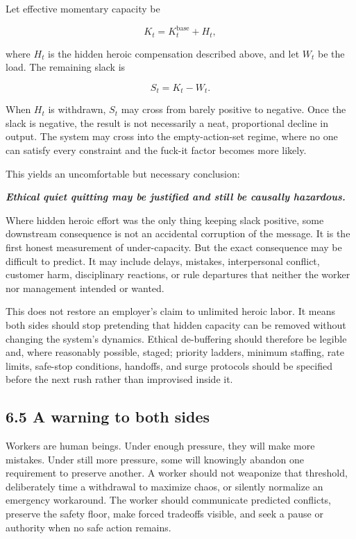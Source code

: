 \documentclass[11pt,oneside]{article}
\renewenvironment{quote}
  {\begin{tcolorbox}[
      enhanced,
      breakable,
      colback=ManifestLight,
      colframe=ManifestRule,
      boxrule=0pt,
      leftrule=3pt,
      arc=0pt,
      outer arc=0pt,
      left=10pt,right=10pt,top=8pt,bottom=8pt,
      before skip=0.8em,after skip=0.8em
    ]\itshape}
  {\end{tcolorbox}}
\begin{document}
Let effective momentary capacity be

\[
K_t = K_t^{\mathrm{base}} + H_t,
\]

where \(H_t\) is the hidden heroic compensation described above, and let
\(W_t\) be the load. The remaining slack is

\[
S_t = K_t - W_t.
\]

When \(H_t\) is withdrawn, \(S_t\) may cross from barely positive to
negative. Once the slack is negative, the result is not necessarily a
neat, proportional decline in output. The system may cross into the
empty-action-set regime, where no one can satisfy every constraint and
the fuck-it factor becomes more likely.

This yields an uncomfortable but necessary conclusion:

\begin{quote}
\textbf{Ethical quiet quitting may be justified and still be causally
hazardous.}
\end{quote}

Where hidden heroic effort was the only thing keeping slack positive,
some downstream consequence is not an accidental corruption of the
message. It is the first honest measurement of under-capacity. But the
exact consequence may be difficult to predict. It may include delays,
mistakes, interpersonal conflict, customer harm, disciplinary reactions,
or rule departures that neither the worker nor management intended or
wanted.

This does not restore an employer's claim to unlimited heroic labor. It
means both sides should stop pretending that hidden capacity can be
removed without changing the system's dynamics. Ethical de-buffering
should therefore be legible and, where reasonably possible, staged;
priority ladders, minimum staffing, rate limits, safe-stop conditions,
handoffs, and surge protocols should be specified before the next rush
rather than improvised inside it.

\subsection{6.5 A warning to both sides}\label{a-warning-to-both-sides}

Workers are human beings. Under enough pressure, they will make more
mistakes. Under still more pressure, some will knowingly abandon one
requirement to preserve another. A worker should not weaponize that
threshold, deliberately time a withdrawal to maximize chaos, or silently
normalize an emergency workaround. The worker should communicate
predicted conflicts, preserve the safety floor, make forced tradeoffs
visible, and seek a pause or authority when no safe action remains.
\end{document}
